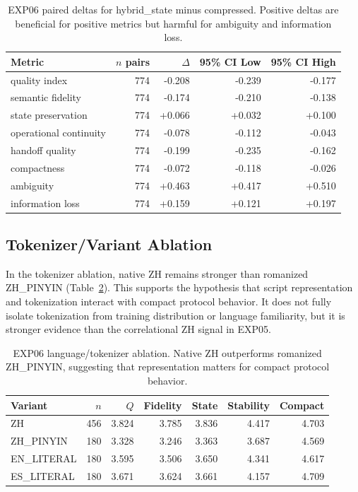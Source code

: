 \documentclass[11pt]{article}
\begin{document}
\begin{table}[ht]
\centering
\small
\begin{tabular}{lrrrr}
\toprule
Metric & $n$ pairs & $\Delta$ & 95\% CI Low & 95\% CI High \\
\midrule
quality index & 774 & -0.208 & -0.239 & -0.177 \\
semantic fidelity & 774 & -0.174 & -0.210 & -0.138 \\
state preservation & 774 & +0.066 & +0.032 & +0.100 \\
operational continuity & 774 & -0.078 & -0.112 & -0.043 \\
handoff quality & 774 & -0.199 & -0.235 & -0.162 \\
compactness & 774 & -0.072 & -0.118 & -0.026 \\
ambiguity & 774 & +0.463 & +0.417 & +0.510 \\
information loss & 774 & +0.159 & +0.121 & +0.197 \\
\bottomrule
\end{tabular}
\caption{EXP06 paired deltas for hybrid\_state minus compressed. Positive deltas are beneficial for positive metrics but harmful for ambiguity and information loss.}
\label{tab:exp06_paired}
\end{table}

\subsection{Tokenizer/Variant Ablation}
In the tokenizer ablation, native ZH remains stronger than romanized ZH\_PINYIN (Table~\ref{tab:exp06_zh}). This supports the hypothesis that script representation and tokenization interact with compact protocol behavior. It does not fully isolate tokenization from training distribution or language familiarity, but it is stronger evidence than the correlational ZH signal in EXP05.

\begin{table}[ht]
\centering
\small
\begin{tabular}{lrrrrrr}
\toprule
Variant & $n$ & $Q$ & Fidelity & State & Stability & Compact \\
\midrule
ZH & 456 & 3.824 & 3.785 & 3.836 & 4.417 & 4.703 \\
ZH\_PINYIN & 180 & 3.328 & 3.246 & 3.363 & 3.687 & 4.569 \\
EN\_LITERAL & 180 & 3.595 & 3.506 & 3.650 & 4.341 & 4.617 \\
ES\_LITERAL & 180 & 3.671 & 3.624 & 3.661 & 4.157 & 4.709 \\
\bottomrule
\end{tabular}
\caption{EXP06 language/tokenizer ablation. Native ZH outperforms romanized ZH\_PINYIN, suggesting that representation matters for compact protocol behavior.}
\label{tab:exp06_zh}
\end{table}
\end{document}
